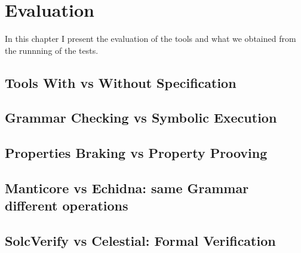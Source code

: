 
\chapter{Evaluation}
\label{ch:Evaluation}

In this chapter I present the evaluation of the tools and what we obtained from the runnning of the tests.


\section{Tools With vs Without Specification}

\section{Grammar Checking vs Symbolic Execution}

\section{Properties Braking vs Property Prooving}

\section{Manticore vs Echidna: same Grammar different operations}


\section{SolcVerify vs Celestial: Formal Verification}


